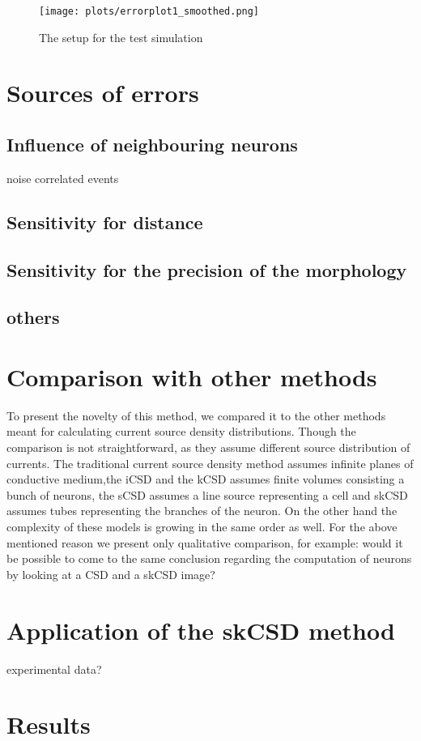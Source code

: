 \documentclass[12pt,a4paper]{article}
\begin{document}
\begin{figure}
\centering
\texttt{[image: plots/errorplot1\_smoothed.png]}
\caption{The setup for the test simulation}
\label{fig: error_current_smoothed_map}
\end{figure}



\section{Sources of errors}
\subsection{Influence of neighbouring neurons }
noise
correlated events
\subsection{Sensitivity for distance }
\subsection{Sensitivity for the precision of the morphology}
\subsection{others}


\section{Comparison with other methods}
To present the novelty of this method, we compared it to the other methods meant for calculating current source density distributions. Though the comparison is not straightforward, as they assume different source distribution of currents. The traditional current source density method assumes infinite planes of conductive medium,the iCSD and the kCSD assumes finite volumes consisting a bunch of neurons, the sCSD assumes a line source representing a cell and skCSD assumes tubes representing the branches of the neuron. On the other hand the complexity of these models is growing in the same order as well.
For the above mentioned reason we present only qualitative comparison, for example: would it be possible to come to the same conclusion regarding the computation of neurons by looking at a CSD and a skCSD image?

\section{Application of the skCSD method}
experimental data?
\section{Results}
\end{document}
